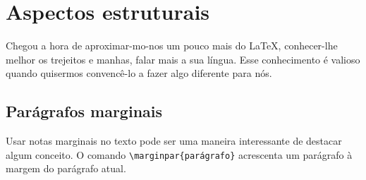 \section{Aspectos estruturais}

Chegou a hora de aproximar-mo-nos um pouco mais do \LaTeX,
conhecer-lhe melhor os trejeitos e manhas, falar mais a sua
língua. Esse conhecimento é valioso quando quisermos convencê-lo a
fazer algo diferente para nós.






\subsection{Parágrafos marginais}
\newcommand{\amounttorotate}{0}\newlength{\recuo}
Usar  notas
marginais no texto pode ser uma maneira interessante de destacar algum
conceito. O comando \verb'\marginpar{parágrafo}' acrescenta um
parágrafo à margem do parágrafo atual. 


